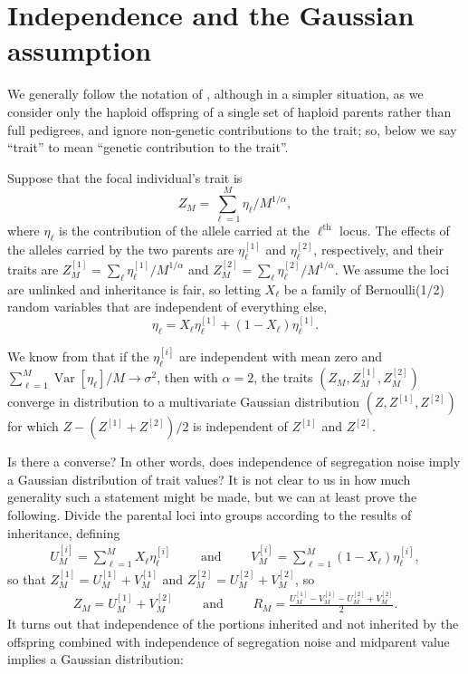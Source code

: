 \documentclass{article}
\newcommand{\var}{\mathop{\mbox{Var}}}
\theoremstyle{remark}
\theoremstyle{definition}
\begin{document}
\section{Independence and the Gaussian assumption}

We generally follow the notation of \citet{barton2017infinitesimal},
although in a simpler situation,
as we consider only the haploid offspring of a single set of haploid parents
rather than full pedigrees,
and ignore non-genetic contributions to the trait;
so, below we say ``trait'' to mean ``genetic contribution to the trait''.

Suppose that the focal individual's trait is
$$
    Z_M = \sum_{\ell=1}^M \eta_\ell / M^{1/\alpha},
$$
where $\eta_\ell$ is the contribution of the allele carried at the $\ell^\text{th}$ locus.
The effects of the alleles carried by the two parents
are $\eta_\ell^{[1]}$ and $\eta_\ell^{[2]}$, respectively,
and their traits are
$Z_M^{[1]} = \sum_\ell \eta_\ell^{[1]} / M^{1/\alpha}$ and
$Z_M^{[2]} = \sum_\ell \eta_\ell^{[2]} / M^{1/\alpha}$.
We assume the loci are unlinked and inheritance is fair, so
letting $X_\ell$ be a family of Bernoulli(1/2) random variables that are independent of everything else,
$$
    \eta_\ell = X_\ell \eta_\ell^{[1]} + (1 - X_\ell) \eta_\ell^{[1]} .
$$

We know from \citet{barton2017infinitesimal} that if the $\eta^{[i]}_\ell$ are
independent with mean zero and $\sum_{\ell=1}^M \var[\eta_\ell]/M \to \sigma^2$,
then with $\alpha=2$,
the traits $(Z_M, Z_M^{[1]}, Z_M^{[2]})$ converge in distribution to a multivariate Gaussian distribution
$(Z, Z^{[1]}, Z^{[2]})$ for which $Z - (Z^{[1]} + Z^{[2]})/2$ is independent of $Z^{[1]}$ and $Z^{[2]}$.

Is there a converse? In other words,
does independence of segregation noise imply a Gaussian distribution of trait values?
It is not clear to us in how much generality such a statement might be made,
but we can at least prove the following.
Divide the parental loci into groups according to the results of inheritance,
defining
\begin{align*}
    U_M^{[i]} = \sum_{\ell=1}^M X_\ell \eta_\ell^{[i]} 
    \qquad \text{ and } \qquad
    V_M^{[i]} = \sum_{\ell=1}^M (1-X_\ell) \eta_\ell^{[i]} ,
\end{align*}
so that 
$Z_M^{[1]} = U_M^{[1]} + V_M^{[1]}$ and
$Z_M^{[2]} = U_M^{[2]} + V_M^{[2]}$, so
\begin{align*}
    Z_M = U_M^{[1]} + V_M^{[2]} \qquad \text{ and } \qquad
    R_M = \frac{U_M^{[1]} - V_M^{[1]} - U_M^{[2]} + V_M^{[2]}}{ 2 } .
\end{align*}
It turns out that independence of the portions inherited and not inherited by the offspring
combined with independence of segregation noise and midparent value
implies a Gaussian distribution:
\end{document}
